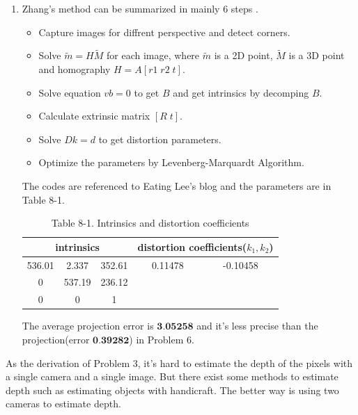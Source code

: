 \documentclass{article}
\begin{document}
\begin{enumerate}
\item Zhang's method can be summarized in mainly 6 steps \cite{ref11}.
\begin{itemize}
	\item Capture images for diffrent perspective and detect corners.
	\item Solve $\widetilde{m} = H \widetilde{M}$ for each image, where $\widetilde{m}$ is a 2D point, $\widetilde{M}$ is a 3D point and homography $H = A[r1 \; r2\; t]$.
	\item Solve equation $vb = 0$ to get $B$ and get intrinsics by decomping $B$.
	\item Calculate extrinsic matrix $[R \; t]$.
	\item Solve $Dk = d$ to get distortion parameters.
	\item Optimize the parameters by Levenberg-Marquardt Algorithm.
\end{itemize}

The codes are referenced to Eating Lee's blog \cite{ref12} and the parameters are in Table 8-1.

\begin{table}[h]
	\caption*{Table 8-1. Intrinsics and distortion coefficients}
	\centering
	\begin{tabular}{ccc|cc}
		\toprule[2pt]
		\multicolumn{3}{c|}{intrinsics} & \multicolumn{2}{c}{distortion coefficients($k_1, k_2$)} \\ \hline
		536.01     & 2.337     & 352.61    & 0.11478           & -0.10458         	  \\
		0          & 537.19    & 236.12    & 					         & 						          \\
		0          & 0         & 1     		 & 					         &                      \\
		\bottomrule[2pt]
	\end{tabular}
\end{table}

The average projection error is $\textbf{3.05258}$ and it's less precise than the projection(error $\textbf{0.39282}$) in Problem 6.

\end{enumerate}

As the derivation of Problem 3, it's hard to estimate the depth of the pixels with a single camera and a single image. But there exist some methods to estimate depth such as estimating objects with handicraft. The better way is using two cameras to estimate depth.
\end{document}
